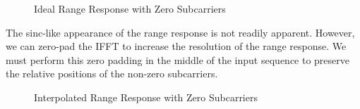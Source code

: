 \documentclass[conference]{IEEEtran}
\begin{document}
		\begin{figure}[H]
			\centering
    			\caption{Ideal Range Response with Zero Subcarriers}
    			\label{fig::ofdm_radar_range_resp_no_window}
  	  	\end{figure}
		
		The sinc-like appearance of the range response is not readily apparent. However, we can zero-pad the IFFT to increase the resolution of the range response. We must perform this zero padding in the middle of the input sequence to preserve the relative positions of the non-zero subcarriers.
		
		\begin{figure}[H]
			\centering
    			\caption{Interpolated Range Response with Zero Subcarriers}
    			\label{fig::ofdm_radar_range_resp_no_window_zpad}
  	  	\end{figure}
  	  	
\end{document}

